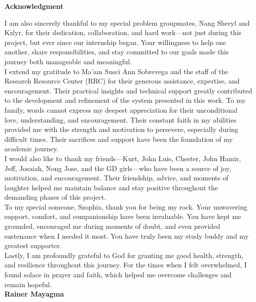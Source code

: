 \begin{center}
	\textbf{Acknowledgment}
\end{center}

I am also sincerely thankful to my special problem groupmates, Nang Sheryl and Kzlyr, for their dedication, collaboration, and hard work—not just during this project, but ever since our internship began. Your willingness to help one another, share responsibilities, and stay committed to our goals made this journey both manageable and meaningful.\\

I extend my gratitude to Ma’am Susci Ann Sobrevega and the staff of the Research Resource Center (RRC) for their generous assistance, expertise, and encouragement. Their practical insights and technical support greatly contributed to the development and refinement of the system presented in this work.
To my family, words cannot express my deepest appreciation for their unconditional love, understanding, and encouragement. Their constant faith in my abilities provided me with the strength and motivation to persevere, especially during difficult times. Their sacrifices and support have been the foundation of my academic journey.\\

I would also like to thank my friends—Kurt, John Luis, Chester, John Hamir, Jeff, Josaiah, Nong Jose, and the GD girls—who have been a source of joy, motivation, and encouragement. Their friendship, advice, and moments of laughter helped me maintain balance and stay positive throughout the demanding phases of this project.\\

To my special someone, Szophia, thank you for being my rock. Your unwavering support, comfort, and companionship have been invaluable. You have kept me grounded, encouraged me during moments of doubt, and even provided sustenance when I needed it most. You have truly been my study buddy and my greatest supporter.\\

Lastly, I am profoundly grateful to God for granting me good health, strength, and resilience throughout this journey. For the times when I felt overwhelmed, I found solace in prayer and faith, which helped me overcome challenges and remain hopeful.
\\
\vspace{0.5em}
\hfill \textbf{Rainer Mayagma}